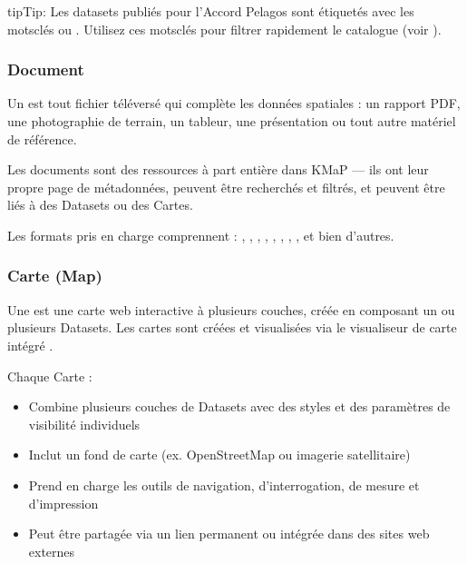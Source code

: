 \documentclass[letterpaper,10pt,english]{sphinxmanual}
\begin{document}
\begin{sphinxadmonition}{tip}{Tip:}
\sphinxAtStartPar
Les datasets publiés pour l’Accord Pelagos sont étiquetés avec les mots\sphinxhyphen{}clés
 ou . Utilisez ces mots\sphinxhyphen{}clés pour filtrer
rapidement le catalogue (voir {\hyperref[\detokenize{fr/02_trouver_visualiser:find-fr}]{}}).
\end{sphinxadmonition}


\subsubsection{Document}
\label{\detokenize{fr/01_bienvenue:document}}
\sphinxAtStartPar
Un  est tout fichier téléversé qui complète les données spatiales : un
rapport PDF, une photographie de terrain, un tableur, une présentation ou tout autre
matériel de référence.

\sphinxAtStartPar
Les documents sont des ressources à part entière dans KMaP — ils ont leur propre page
de métadonnées, peuvent être recherchés et filtrés, et peuvent être liés à des Datasets
ou des Cartes.

\sphinxAtStartPar
Les formats pris en charge comprennent : , , , ,
, , , ,  et bien d’autres.


\subsubsection{Carte (Map)}
\label{\detokenize{fr/01_bienvenue:carte-map}}
\sphinxAtStartPar
Une  est une carte web interactive à plusieurs couches, créée en composant
un ou plusieurs Datasets. Les cartes sont créées et visualisées via le visualiseur de
carte intégré .

\sphinxAtStartPar
Chaque Carte :
\begin{itemize}
\item {} 
\sphinxAtStartPar
Combine plusieurs couches de Datasets avec des styles et des paramètres de visibilité
individuels

\item {} 
\sphinxAtStartPar
Inclut un fond de carte (ex. OpenStreetMap ou imagerie satellitaire)

\item {} 
\sphinxAtStartPar
Prend en charge les outils de navigation, d’interrogation, de mesure et d’impression

\item {} 
\sphinxAtStartPar
Peut être partagée via un lien permanent ou intégrée dans des sites web externes

\end{itemize}
\end{document}
